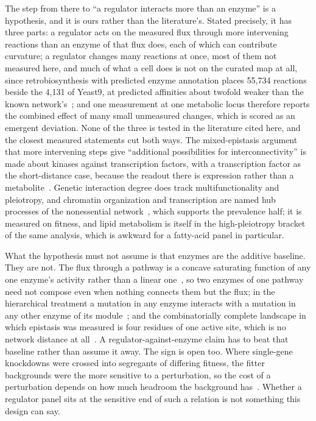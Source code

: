 The step from there to ``a regulator interacts more than an enzyme'' is a hypothesis, and
it is ours rather than the literature's. Stated precisely, it has three parts: a regulator
acts on the measured flux through more intervening reactions than an enzyme of that flux
does, each of which can contribute curvature; a regulator changes many reactions at once,
most of them not measured here, and much of what a cell does is not on the curated map at
all, since retrobiosynthesis with predicted enzyme annotation places 55,734 reactions
beside the 4,131 of Yeast9, at predicted affinities about twofold weaker than the known
network's~\citep{wuSystematicallyExploringYeast2026}; and one measurement at one metabolic
locus therefore reports the combined effect of many small unmeasured changes, which is
scored as an emergent deviation. None of the three is tested in the literature cited here,
and the closest measured statements cut both ways. The mixed-epistasis argument that more
intervening steps give ``additional possibilities for
interconnectivity'' is made about kinases against transcription
factors, with a transcription factor as the short-distance case, because the readout there
is expression rather than a metabolite~\citep{sameithHighresolutionGeneExpression2015}.
Genetic interaction degree does track multifunctionality and pleiotropy, and chromatin
organization and transcription are named hub processes of the nonessential
network~\citep{costanzoGlobalGeneticInteraction2016}, which supports the prevalence half;
it is measured on fitness, and lipid metabolism is itself in the high-pleiotropy bracket of
the same analysis, which is awkward for a fatty-acid panel in particular.

What the hypothesis must not assume is that enzymes are the additive baseline. They are
not. The flux through a pathway is a concave saturating function of any one enzyme's
activity rather than a linear one~\citep{domingoCausesConsequencesGenetic2019}, so two
enzymes of one pathway need not compose even when nothing connects them but the flux; in the hierarchical treatment a
mutation in any enzyme interacts with a mutation in any other enzyme of its
module~\citep{kryazhimskiyEmergencePropagationEpistasis2021}; and the combinatorially complete
landscape in which epistasis was measured is four residues of one active site, which is no
network distance at all~\citep{johnstonCombinatoriallyCompleteEpistatic2024}. A
regulator-against-enzyme claim has to beat that baseline rather than assume it away. The
sign is open too. Where single-gene knockdowns were crossed into segregants of differing
fitness, the fitter backgrounds were the more sensitive to a perturbation, so the cost of
a perturbation depends on how much headroom the background
has~\citep{goldsteinGlobalEpistasisBudding2025}. Whether a regulator panel sits at the
sensitive end of such a relation is not something this design can say.

